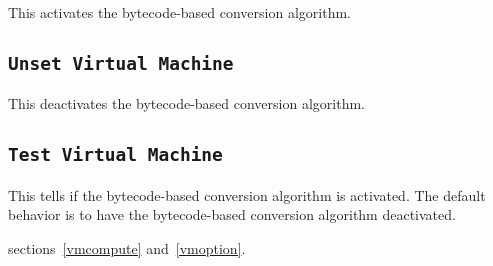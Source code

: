 This activates the bytecode-based conversion algorithm.

\subsection{\tt Unset Virtual Machine
}

This deactivates the bytecode-based conversion algorithm.

\subsection{\tt Test Virtual Machine
}

This tells if the bytecode-based conversion algorithm is
activated. The default behavior is to have the bytecode-based
conversion algorithm deactivated.

\SeeAlso sections~\ref{vmcompute} and~\ref{vmoption}.



